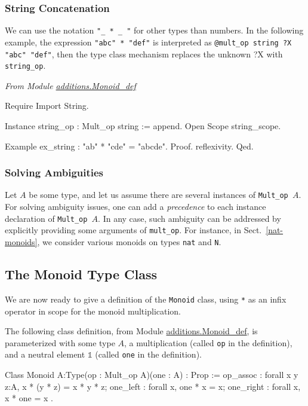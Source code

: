 \subsubsection{String Concatenation}
We can use the notation \texttt{"\_ * \_ "} for other types than numbers.
In the following example,  the expression \texttt{"abc" * "def"} is interpreted
as \linebreak \texttt{@mult\_op string  {\color{darkred}?X} "abc"  "def"}, then the type  class mechanism replaces the unknown  {\color{darkred}?X} with 
\texttt{string\_op}.


\emph{From Module \href{../theories/html/hydras.additions.Monoid_def.html}{additions.Monoid\_def}}

\begin{Coqsrc}
Require Import String.

Instance string_op : Mult_op string := append.
Open Scope string_scope.

Example ex_string : "ab" * "cde" = "abcde".
Proof. reflexivity. Qed.
\end{Coqsrc}


\subsubsection{Solving Ambiguities}
Let $A$ be some type, and let us assume there are several instances of
\texttt{Mult\_op $A$}. For solving ambiguity issues, one can
add a \emph{precedence} to each instance declaration of  
\texttt{Mult\_op $A$}. In any case, such ambiguity  can be addressed
by explicitly providing  some arguments of \texttt{mult\_op}.
For instance, in Sect.~\vref{nat-monoids}, we consider various monoids on types
\texttt{nat} and \texttt{N}. 


\subsection{The Monoid Type Class}
We are now ready to  give a definition of the \texttt{Monoid} class, using
\texttt{*} as an infix operator in scope  for the monoid  multiplication.

The following class definition, from Module \href{../theories/html/hydras.additions.Monoid_def.html}{additions.Monoid\_def},
is parameterized with some type $A$,
a multiplication (called \texttt{op} in the definition), and a neutral element
$\mathds{1}$ (called \texttt{one} in the definition).


\begin{Coqsrc}
Class Monoid {A:Type}(op : Mult_op A)(one : A) : Prop :=
{
    op_assoc : forall x y z:A, x * (y * z) = x * y * z;
    one_left : forall x, one * x = x;
    one_right : forall x, x * one = x
}.
\end{Coqsrc}


